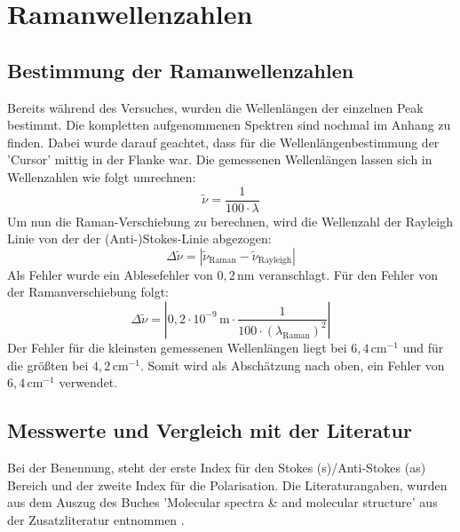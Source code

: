 \section{Ramanwellenzahlen}
\subsection{Bestimmung der Ramanwellenzahlen}
Bereits während des Versuches, wurden die Wellenlängen der einzelnen Peak bestimmt.
Die kompletten aufgenommenen Spektren sind nochmal im Anhang zu finden.
Dabei wurde darauf geachtet, dass für die Wellenlängenbestimmung der 'Cursor' mittig in der Flanke war.
Die gemessenen Wellenlängen lassen sich in Wellenzahlen wie folgt umrechnen:
\begin{equation}
    \tilde{\nu}=\frac{1}{100\cdot\lambda}
\end{equation}
Um nun die Raman-Verschiebung zu berechnen, wird die Wellenzahl der Rayleigh Linie von der der (Anti-)Stokes-Linie abgezogen:
\begin{equation}
    \Delta\tilde{\nu}=\left|\tilde{\nu}_\text{Raman}-\tilde{\nu}_\text{Rayleigh}\right|
\end{equation}
Als Fehler wurde ein Ablesefehler von $0,2\,\text{nm}$ veranschlagt.
Für den Fehler von der Ramanverschiebung folgt:
\begin{equation}
    \Delta\tilde{\nu}=\left|0,2\cdot10^{-9}\,\text{m}\cdot\frac{1}{100\cdot\left(\lambda_\text{Raman}\right)^2}\right|
\end{equation}
Der Fehler für die kleinsten gemessenen Wellenlängen liegt bei $6,4\,\text{cm}^{-1}$ und für die größten bei $4,2\,\text{cm}^{-1}$.
Somit wird als Abschätzung nach oben, ein Fehler von $6,4\,\text{cm}^{-1}$ verwendet.\newpage
\subsection{Messwerte und Vergleich mit der Literatur}
Bei der Benennung, steht der erste Index für den Stokes (s)/Anti-Stokes (as) Bereich und der zweite Index für die Polarisation.
Die Literaturangaben, wurden aus dem Auszug des Buches 'Molecular spectra \& and molecular structure' aus der Zusatzliteratur entnommen \citep{zusatzliteratur}.
